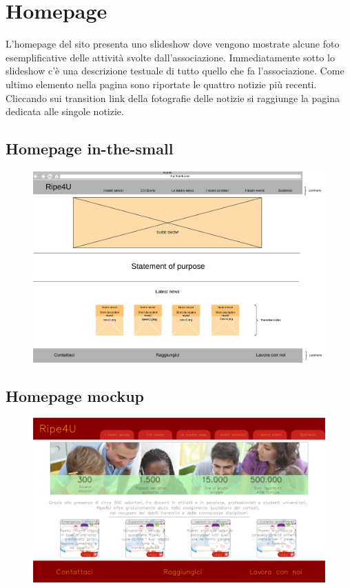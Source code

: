     \newpage    
    \section{Homepage}
    L'homepage del sito presenta uno slideshow dove vengono mostrate alcune foto
    esemplificative delle attività svolte dall'associazione. Immediatamente
    sotto lo slideshow c'è una descrizione testuale di tutto quello che fa
    l'associazione. Come ultimo elemento nella pagina sono riportate le quattro
    notizie più recenti. Cliccando sui transition link della fotografie delle
    notizie si raggiunge la pagina dedicata alle singole notizie.
        
        \subsection{Homepage in-the-small}
        \begin{figure}[H]
            \centering
            \includegraphics[scale=0.37]{resources/images/homepage-in-the-small.jpg}
        \end{figure}

        \subsection{Homepage mockup}
        \begin{figure}[H]
            \centering
            \includegraphics[scale=0.18]{resources/images/homepage-mockup.png}
        \end{figure}


    